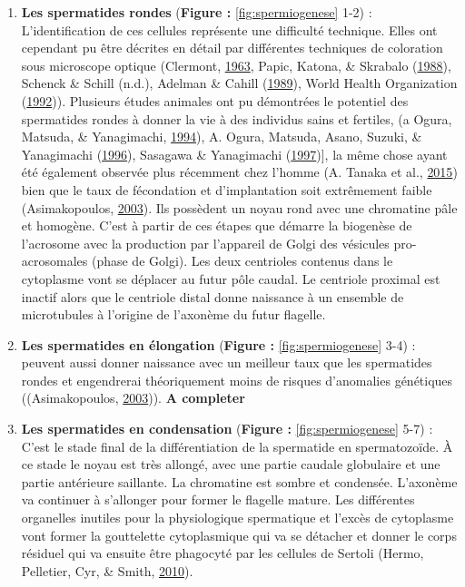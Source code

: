 \documentclass[12pt,twoside]{reedthesis}
\providecommand{\tightlist}{%
  \setlength{\itemsep}{0pt}\setlength{\parskip}{0pt}}
\theoremstyle{definition}
\theoremstyle{definition}
\theoremstyle{remark}
\begin{document}
  \begin{enumerate}
  \def\labelenumi{\arabic{enumi}.}
  \tightlist
  \item
    \textbf{Les spermatides rondes} (\textbf{Figure :
    }\ref{fig:spermiogenese} 1-2) : L'identification de ces cellules
    représente une difficulté technique. Elles ont cependant pu être
    décrites en détail par différentes techniques de coloration sous
    microscope optique (Clermont,
    \protect\hyperlink{ref-Clermont1963}{1963}, Papic, Katona, \& Skrabalo
    (\protect\hyperlink{ref-Papic}{1988}), Schenck \& Schill (n.d.),
    Adelman \& Cahill (\protect\hyperlink{ref-Adelman1989}{1989}), World
    Health Organization
    (\protect\hyperlink{ref-WorldHealthOrganization1992}{1992})).
    Plusieurs études animales ont pu démontrées le potentiel des
    spermatides rondes à donner la vie à des individus sains et fertiles,
    (a Ogura, Matsuda, \& Yanagimachi,
    \protect\hyperlink{ref-Ogura1994}{1994}), A. Ogura, Matsuda, Asano,
    Suzuki, \& Yanagimachi (\protect\hyperlink{ref-Kimura1995}{1996}),
    Sasagawa \& Yanagimachi (\protect\hyperlink{ref-Sasagawa}{1997}){]},
    la même chose ayant été également observée plus récemment chez l'homme
    (A. Tanaka et al., \protect\hyperlink{ref-Tanaka2015}{2015}) bien que
    le taux de fécondation et d'implantation soit extrêmement faible
    (Asimakopoulos, \protect\hyperlink{ref-Asimakopoulos2003}{2003}). Ils
    possèdent un noyau rond avec une chromatine pâle et homogène. C'est à
    partir de ces étapes que démarre la biogenèse de l'acrosome avec la
    production par l'appareil de Golgi des vésicules pro-acrosomales
    (phase de Golgi). Les deux centrioles contenus dans le cytoplasme vont
    se déplacer au futur pôle caudal. Le centriole proximal est inactif
    alors que le centriole distal donne naissance à un ensemble de
    microtubules à l'origine de l'axonème du futur flagelle.\\
  \item
    \textbf{Les spermatides en élongation} (\textbf{Figure :
    }\ref{fig:spermiogenese} 3-4) :\\
    peuvent aussi donner naissance avec un meilleur taux que les
    spermatides rondes et engendrerai théoriquement moins de risques
    d'anomalies génétiques ((Asimakopoulos,
    \protect\hyperlink{ref-Asimakopoulos2003}{2003})). \textbf{A
    completer}\\
  \item
    \textbf{Les spermatides en condensation} (\textbf{Figure :
    }\ref{fig:spermiogenese} 5-7) : C'est le stade final de la
    différentiation de la spermatide en spermatozoïde. À ce stade le noyau
    est très allongé, avec une partie caudale globulaire et une partie
    antérieure saillante. La chromatine est sombre et condensée. L'axonème
    va continuer à s'allonger pour former le flagelle mature. Les
    différentes organelles inutiles pour la physiologique spermatique et
    l'excès de cytoplasme vont former la gouttelette cytoplasmique qui va
    se détacher et donner le corps résiduel qui va ensuite être phagocyté
    par les cellules de Sertoli (Hermo, Pelletier, Cyr, \& Smith,
    \protect\hyperlink{ref-Hermo2010}{2010}).
  \end{enumerate}
  
\end{document}

